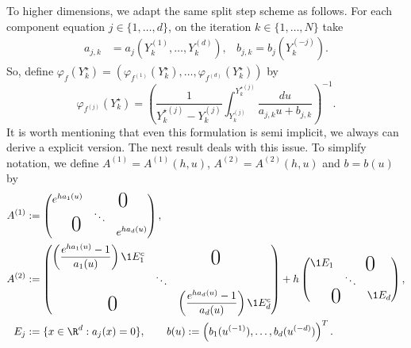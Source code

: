 	To higher dimensions, we adapt the same split step scheme  as follows. 
For each component equation $j\in\{1, \ldots,  d\}$, on the iteration $k\in\{1, \ldots,  N\}$ take
\begin{align}
	a_{j,k} &=
	a_j
	\left(
		Y^{(1)}_{k},
		\ldots, Y^{(d)}_{k}
	\right),
	&
	b_{j,k} =
	b_{j}
	\left(
			Y^{(-j)}_k
	\right).
\end{align}
So, define  
$
	\varphi_{f}(Y_k^{\star})=
		\left(
			\varphi_{f^{(1)}}(Y_k^{\star}),
			\ldots,
			\varphi_{f^{(d)}}(Y_k^{\star})
		\right)
$
by
\begin{equation}
	\varphi_{f^{(j)}}\left(Y_k^{\star}\right)
		=
		\left(
			\frac{1}{Y_{k}^{\star(j)}-Y_{k}^{(j)}}
			\int 
				_{Y_{k}^{(j)}}^{Y_{k}^{\star(j)}}
				\frac{du}
				{
					a_{j,k} u
					+b_{j,k}
				}
		\right)^{-1}.
\end{equation}
%
	It is worth mentioning that even this formulation is semi implicit, we always can derive a explicit version. 
The next result deals with this issue. To simplify notation, we define  $A^{(1)}= A^{(1)}(h,u)$,  $A^{(2)}=A^{(2)}(h,u)$  and $b=b(u)$ by 
\begin{align}\label{eqn:SolutionFunctions}	
	A^{(1)}&:=
		\begin{pmatrix}
			e^{ha_1(u)} & \multicolumn{2}{c}{\text{\kern0.5em\smash{\raisebox{-1ex}{\huge 0}}}} \\
			&\ddots\\
			\multicolumn{2}{c}{\text{\kern-0.5em\smash{\raisebox{0.95ex}{\huge 0}}}} 
			& e^{ha_d(u)}
		\end{pmatrix},
		\notag
		\\
	A^{(2)}&:=
	\begin{pmatrix}
		\left(
			\displaystyle
			\frac{e^{ha_1(u)} - 1}{a_1(u)}
		\right)\1{E_1^c}	& 
		\multicolumn{2}{c}{\text{\kern0.5em\smash{\raisebox{-1ex}{\huge 0}}}}\\
		 & \ddots&\\
		\multicolumn{2}{c}{\text{\kern0.5em\smash{\raisebox{-1ex}{\huge 0}}}}&
		\left(
			\displaystyle
			\frac{e^{ha_d(u)} - 1}{a_d(u)}
		\right)\1{E_d^c}%
	\end{pmatrix}
	+h
	\begin{pmatrix}
		\1{E_1} & \multicolumn{2}{c}{\text{\kern0.5em\smash{\raisebox{-1ex}{\huge 0}}}}\\
		&\ddots &\\
		\multicolumn{2}{c}{\text{\kern0.5em\smash{\raisebox{-1ex}{\huge 0}}}} &
		\1{E_d}
	\end{pmatrix},\\	
	E_j&:=\{x \in \R^d: a_j(x)=0\} , \qquad 
	b(u):= \left(
		b_1(u^{(-1)}), \dots , b_d(u^{(-d)})
	\right)^T.		
	\notag
\end{align}
